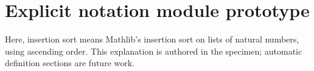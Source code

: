 \documentclass[11pt]{article}
\begin{document}
\par\medskip
\section*{Explicit notation module prototype}
Here, insertion sort means Mathlib's insertion sort on lists of natural numbers, using ascending order. This explanation is authored in the specimen; automatic definition sections are future work.
\end{document}
